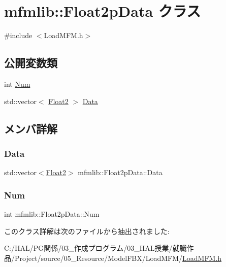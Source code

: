 \hypertarget{classmfmlib_1_1_float2p_data}{}\section{mfmlib\+:\+:Float2p\+Data クラス}
\label{classmfmlib_1_1_float2p_data}


{\ttfamily \#include $<$Load\+M\+F\+M.\+h$>$}

\subsection*{公開変数類}
\begin{DoxyCompactItemize}
\item 
int \mbox{\hyperlink{classmfmlib_1_1_float2p_data_a042ca0e2fb830a1b19f389b0a7749c86}{Num}}
\item 
std\+::vector$<$ \mbox{\hyperlink{structmfmlib_1_1_float2}{Float2}} $>$ \mbox{\hyperlink{classmfmlib_1_1_float2p_data_a8bc11bb9be3cb26515e8b1afa6e88604}{Data}}
\end{DoxyCompactItemize}


\subsection{メンバ詳解}
\mbox{\label{classmfmlib_1_1_float2p_data_a8bc11bb9be3cb26515e8b1afa6e88604}} 
\subsubsection{\texorpdfstring{Data}{Data}}
{\footnotesize\ttfamily std\+::vector$<$\mbox{\hyperlink{structmfmlib_1_1_float2}{Float2}}$>$ mfmlib\+::\+Float2p\+Data\+::\+Data}

\mbox{\label{classmfmlib_1_1_float2p_data_a042ca0e2fb830a1b19f389b0a7749c86}} 
\subsubsection{\texorpdfstring{Num}{Num}}
{\footnotesize\ttfamily int mfmlib\+::\+Float2p\+Data\+::\+Num}



このクラス詳解は次のファイルから抽出されました\+:\begin{DoxyCompactItemize}
\item 
C\+:/\+H\+A\+L/\+P\+G関係/03\+\_\+作成プログラム/03\+\_\+\+H\+A\+L授業/就職作品/\+Project/source/05\+\_\+\+Resource/\+Model\+F\+B\+X/\+Load\+M\+F\+M/\mbox{\hyperlink{_load_m_f_m_8h}{Load\+M\+F\+M.\+h}}\end{DoxyCompactItemize}
